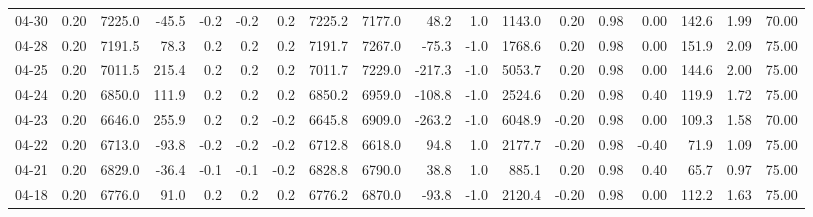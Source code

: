 \begin{threeparttable}
{\begin{tabular}{lrrrrrrrrrrrrrrrrr}
  04-30 &     0.20 & 7225.0 &             -45.5 &              -0.2 &               -0.2 &                0.2 & 7225.2 & 7177.0 &       48.2 &                      1.0 &              1143.0 &       0.20 &      0.98 &           0.00 &            142.6 &            1.99 &                  70.00 \\
  04-28 &     0.20 & 7191.5 &              78.3 &               0.2 &                0.2 &                0.2 & 7191.7 & 7267.0 &      -75.3 &                     -1.0 &              1768.6 &       0.20 &      0.98 &           0.00 &            151.9 &            2.09 &                  75.00 \\
  04-25 &     0.20 & 7011.5 &             215.4 &               0.2 &                0.2 &                0.2 & 7011.7 & 7229.0 &     -217.3 &                     -1.0 &              5053.7 &       0.20 &      0.98 &           0.00 &            144.6 &            2.00 &                  75.00 \\
  04-24 &     0.20 & 6850.0 &             111.9 &               0.2 &                0.2 &                0.2 & 6850.2 & 6959.0 &     -108.8 &                     -1.0 &              2524.6 &       0.20 &      0.98 &           0.40 &            119.9 &            1.72 &                  75.00 \\
  04-23 &     0.20 & 6646.0 &             255.9 &               0.2 &                0.2 &               -0.2 & 6645.8 & 6909.0 &     -263.2 &                     -1.0 &              6048.9 &      -0.20 &      0.98 &           0.00 &            109.3 &            1.58 &                  70.00 \\
  04-22 &     0.20 & 6713.0 &             -93.8 &              -0.2 &               -0.2 &               -0.2 & 6712.8 & 6618.0 &       94.8 &                      1.0 &              2177.7 &      -0.20 &      0.98 &          -0.40 &             71.9 &            1.09 &                  75.00 \\
  04-21 &     0.20 & 6829.0 &             -36.4 &              -0.1 &               -0.1 &               -0.2 & 6828.8 & 6790.0 &       38.8 &                      1.0 &               885.1 &       0.20 &      0.98 &           0.40 &             65.7 &            0.97 &                  75.00 \\
  04-18 &     0.20 & 6776.0 &              91.0 &               0.2 &                0.2 &                0.2 & 6776.2 & 6870.0 &      -93.8 &                     -1.0 &              2120.4 &      -0.20 &      0.98 &           0.00 &            112.2 &            1.63 &                  75.00 \\

\end{tabular}}
\end{threeparttable}
